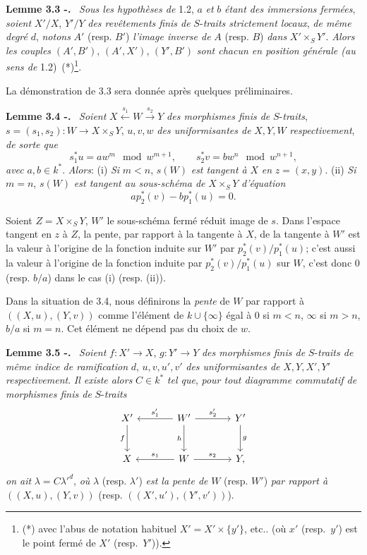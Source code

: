 \documentclass[11pt]{article}
\newenvironment{statement}[1]{\par\medskip\noindent\textbf{#1.}\ }{\par\medskip}
\begin{document}
\begin{statement}{Lemme 3.3 -}
\emph{Sous les hypothèses de} 1.2, $a$ \emph{et} $b$ \emph{étant des immersions fermées}, \emph{soient} $X'/X$, $Y'/Y$ \emph{des revêtements finis de} $S$-\emph{traits strictement locaux}, \emph{de même degré} $d$, \emph{notons} $A'$ (resp. $B'$) \emph{l'image inverse de} $A$ (resp. $B$) \emph{dans} $X'\times_S Y'$. \emph{Alors les couples} $(A',B')$, $(A',X')$, $(Y',B')$ \emph{sont chacun en position générale (au sens de} 1.2)~(*)\footnote{(*) avec l'abus de notation habituel $X'=X'\times\{y'\}$, etc.. (où $x'$ (resp.\ $y'$) est le point fermé de $X'$ (resp.\ $Y'$)).}.
\end{statement}

La démonstration de 3.3 sera donnée après quelques préliminaires.

\begin{statement}{Lemme 3.4 -}
\emph{Soient} $X\xleftarrow{s_1}W\xrightarrow{s_2}Y$ \emph{des morphismes finis de} $S$-\emph{traits}, $s=(s_1,s_2):W\to X\times_SY$, $u,v,w$ \emph{des uniformisantes de} $X,Y,W$ \emph{respectivement}, \emph{de sorte que}
\[
s_1^*u=aw^m\mod {w^{m+1}},\qquad
s_2^*v=bw^n\mod {w^{n+1}},
\]
\emph{avec} $a,b\in k^*$. \emph{Alors}: (i) \emph{Si} $m<n$, $s(W)$ \emph{est tangent à} $X$ \emph{en} $z=(x,y)$. (ii) \emph{Si} $m=n$, $s(W)$ \emph{est tangent au sous-schéma de} $X\times_SY$ \emph{d'équation}
\[
ap_2^*(v)-bp_1^*(u)=0.
\]
\end{statement}

Soient $Z=X\times_SY$, $W'$ le sous-schéma fermé réduit image de $s$. Dans l'espace tangent en $z$ à $Z$, la pente, par rapport à la tangente à $X$, de la tangente à $W'$ est la valeur à l'origine de la fonction induite sur $W'$ par $p_2^*(v)/p_1^*(u)$; c'est aussi la valeur à l'origine de la fonction induite par $p_2^*(v)/p_1^*(u)$ sur $W$, c'est donc $0$ (resp. $b/a$) dans le cas (i) (resp. (ii)).

Dans la situation de 3.4, nous définirons la \emph{pente} de $W$ par rapport à $((X,u),(Y,v))$ comme l'élément de $k\cup\{\infty\}$ égal à $0$ si $m<n$, $\infty$ si $m>n$, $b/a$ si $m=n$. Cet élément ne dépend pas du choix de $w$.

\begin{statement}{Lemme 3.5 -}
\emph{Soient} $f:X'\to X$, $g:Y'\to Y$ \emph{des morphismes finis de} $S$-\emph{traits de même indice de ramification} $d$, $u,v,u',v'$ \emph{des uniformisantes de} $X,Y,X',Y'$ \emph{respectivement}. \emph{Il existe alors} $C\in k^*$ \emph{tel que}, \emph{pour tout diagramme commutatif de morphismes finis de} $S$-\emph{traits}
\[
\begin{tikzcd}[column sep=large,row sep=large]
X' \arrow[d,"f"'] & W' \arrow[l,"s'_1"'] \arrow[r,"s'_2"] \arrow[d,"h"'] & Y' \arrow[d,"g"]\\
X & W \arrow[l,"s_1"'] \arrow[r,"s_2"] & Y ,
\end{tikzcd}
\]
\emph{on ait} $\lambda=C{\lambda'}^d$, \emph{où} $\lambda$ (resp. $\lambda'$) \emph{est la pente de} $W$ (resp. $W'$) \emph{par rapport à} $((X,u),(Y,v))$ (resp. $((X',u'),(Y',v'))$).
\end{statement}
\end{document}

